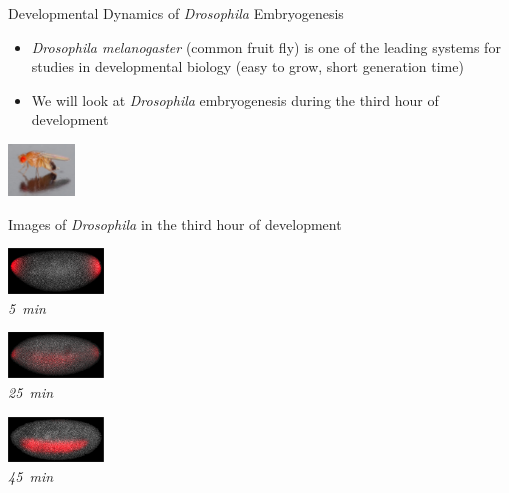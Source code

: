 \documentclass[10pt]{beamer}
\begin{document}
\begin{frame}{Developmental Dynamics of {\em Drosophila} Embryogenesis}

\begin{minipage}[b]{0.7\textwidth}
\vspace{0.2in}
\begin{itemize}
\item {\em Drosophila melanogaster} (common fruit fly) is one of the leading systems for studies in developmental biology (easy to grow, short generation time)
\item We will look at {\em Drosophila} embryogenesis during the third hour of development
\end{itemize}
\end{minipage}
%
\hspace{0.2in}
\includegraphics[width=0.7in]{drosophila_picture}

\vspace{0.3in}

\begin{center}
Images of {\em Drosophila} in the third hour of development


\begin{minipage}{0.3\textwidth}
\centering
\includegraphics[width=1in]{longitudinal_5min}\\
{\em \scriptsize 5~min}
\end{minipage}
%
\begin{minipage}{0.3\textwidth}
\centering
\includegraphics[width=1in]{longitudinal_25min}\\
{\em \scriptsize 25~min}
\end{minipage}
%
\begin{minipage}{0.3\textwidth}
\centering
\includegraphics[width=1in]{longitudinal_45min}\\
{\em \scriptsize 45~min}
\end{minipage}


\end{center}
\end{frame}
\end{document}
